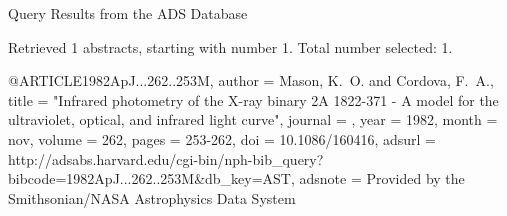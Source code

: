 Query Results from the ADS Database


Retrieved 1 abstracts, starting with number 1.  Total number selected: 1.

@ARTICLE{1982ApJ...262..253M,
   author = {{Mason}, K.~O. and {Cordova}, F.~A.},
    title = "{Infrared photometry of the X-ray binary 2A 1822-371 - A model for the ultraviolet, optical, and infrared light curve}",
  journal = {\apj},
     year = 1982,
    month = nov,
   volume = 262,
    pages = {253-262},
      doi = {10.1086/160416},
   adsurl = {http://adsabs.harvard.edu/cgi-bin/nph-bib_query?bibcode=1982ApJ...262..253M&db_key=AST},
  adsnote = {Provided by the Smithsonian/NASA Astrophysics Data System}
}


